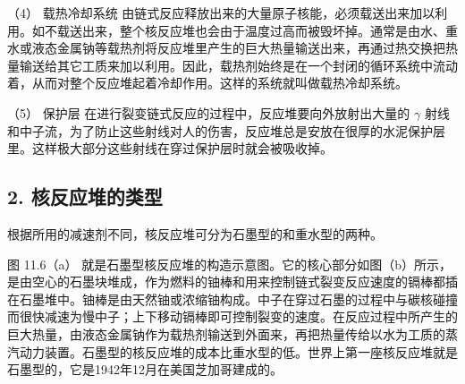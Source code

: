 （4） 载热冷却系统
由链式反应释放出来的大量原子核能，必须载送出来加以利用。如不载送出来，整个核反应堆也会由于温度过高而被毁坏掉。通常是由水、重水或液态金属钠等载热剂将反应堆里产生的巨大热量输送出来，再通过热交换把热量输送给其它工质来加以利用。因此，载热剂始终是在一个封闭的循环系统中流动着，从而对整个反应堆起着冷却作用。这样的系统就叫做载热冷却系统。

（5） 保护层 在进行裂变链式反应的过程中，反应堆要向外放射出大量的
\(\gamma\)
射线和中子流，为了防止这些射线对人的伤害，反应堆总是安放在很厚的水泥保护层里。这样极大部分这些射线在穿过保护层时就会被吸收掉。

\subsection{2.
核反应堆的类型}

根据所用的减速剂不同，核反应堆可分为石墨型的和重水型的两种。

图 11.6（a）
就是石墨型核反应堆的构造示意图。它的核心部分如图（b）所示，是由空心的石墨块堆成，作为燃料的铀棒和用来控制链式裂变反应速度的镉棒都插在石墨堆中。铀棒是由天然铀或浓缩铀构成。中子在穿过石墨的过程中与碳核碰撞而很快减速为慢中子；上下移动镉棒即可控制裂变的速度。在反应过程中所产生的巨大热量，由液态金属钠作为载热剂输送到外面来，再把热量传给以水为工质的蒸汽动力装置。石墨型的核反应堆的成本比重水型的低。世界上第一座核反应堆就是石墨型的，它是1942年12月在美国芝加哥建成的。


